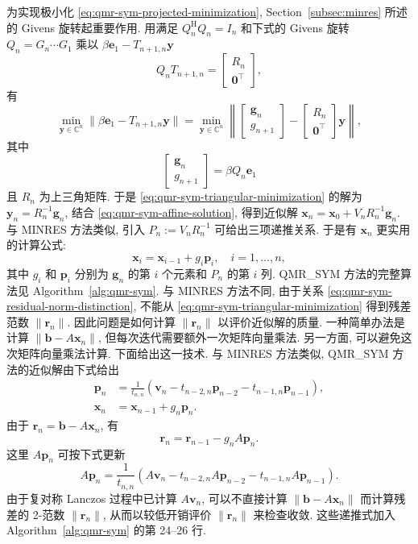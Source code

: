 {为实现极小化 \eqref{eq:qmr-sym-projected-minimization}, Section\ \ref{subsec:minres} 所述的 Givens 旋转起重要作用. 用满足 $Q_n^{\mathrm H}Q_n=I_n$ 和下式的 Givens 旋转 $Q_n=G_n\cdots G_1$ 乘以 $\beta\bm e_1-T_{n+1,n}\bm y$}
\[Q_nT_{n+1,n}=\begin{bmatrix}R_n\\\bm0^{\top}\end{bmatrix},\]
{有}
\begin{equation}\label{eq:qmr-sym-triangular-minimization}
\min_{\bm y\in\mathbb C^n}\|\beta\bm e_1-T_{n+1,n}\bm y\|=\min_{\bm y\in\mathbb C^n}\left\|\begin{bmatrix}\bm g_n\\g_{n+1}\end{bmatrix}-\begin{bmatrix}R_n\\\bm0^{\top}\end{bmatrix}\bm y\right\|,
\end{equation}
{其中}
\[\begin{bmatrix}\bm g_n\\g_{n+1}\end{bmatrix}=\beta Q_n\bm e_1\]
{且 $R_n$ 为上三角矩阵. 于是 \eqref{eq:qmr-sym-triangular-minimization} 的解为 $\bm y_n=R_n^{-1}\bm g_n$, 结合 \eqref{eq:qmr-sym-affine-solution}, 得到近似解 $\bm x_n=\bm x_0+V_nR_n^{-1}\bm g_n$. 与 MINRES 方法类似, 引入 $P_n:=V_nR_n^{-1}$ 可给出三项递推关系. 于是有 $\bm x_n$ 更实用的计算公式:}
\[\bm x_i=\bm x_{i-1}+g_i\bm p_i,\quad i=1,\ldots,n,\]
{其中 $g_i$ 和 $\bm p_i$ 分别为 $\bm g_n$ 的第 $i$ 个元素和 $P_n$ 的第 $i$ 列. QMR\_SYM 方法的完整算法见 Algorithm\ \ref{alg:qmr-sym}. 与 MINRES 方法不同, 由于关系 \eqref{eq:qmr-sym-residual-norm-distinction}, 不能从 \eqref{eq:qmr-sym-triangular-minimization} 得到残差范数 $\|\bm r_n\|$. 因此问题是如何计算 $\|\bm r_n\|$ 以评价近似解的质量. 一种简单办法是计算 $\|\bm b-A\bm x_n\|$, 但每次迭代需要额外一次矩阵向量乘法. 另一方面, 可以避免这次矩阵向量乘法计算. 下面给出这一技术. 与 MINRES 方法类似, QMR\_SYM 方法的近似解由下式给出}
\[\begin{aligned}\bm p_n&=\frac1{t_{n,n}}(\bm v_n-t_{n-2,n}\bm p_{n-2}-t_{n-1,n}\bm p_{n-1}),\\\bm x_n&=\bm x_{n-1}+g_n\bm p_n.\end{aligned}\]
{由于 $\bm r_n=\bm b-A\bm x_n$, 有}
\[\bm r_n=\bm r_{n-1}-g_nA\bm p_n.\]
{这里 $A\bm p_n$ 可按下式更新}
\[A\bm p_n=\frac1{t_{n,n}}(A\bm v_n-t_{n-2,n}A\bm p_{n-2}-t_{n-1,n}A\bm p_{n-1}).\]
{由于复对称 Lanczos 过程中已计算 $A\bm v_n$, 可以不直接计算 $\|\bm b-A\bm x_n\|$ 而计算残差的 2-范数 $\|\bm r_n\|$, 从而以较低开销评价 $\|\bm r_n\|$ 来检查收敛. 这些递推式加入 Algorithm\ \ref{alg:qmr-sym} 的第 24--26 行.}
